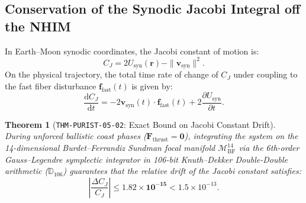\documentclass[11pt,a4paper,reqno]{article}
\theoremstyle{plain}
\newtheorem{theorem}{Theorem}[section]
\theoremstyle{definition}
\theoremstyle{remark}
\numberwithin{equation}{section}
\begin{document}
\subsection{Conservation of the Synodic Jacobi Integral off the NHIM}
In Earth--Moon synodic coordinates, the Jacobi constant of motion is:
\begin{equation}
  C_J = 2 U_{\mathrm{syn}}(\bm{r}) - \|\bm{v}_{\mathrm{syn}}\|^2.
\end{equation}
On the physical trajectory, the total time rate of change of $C_J$ under coupling to the fast fiber disturbance $\bm{f}_{\mathrm{fast}}(t)$ is given by:
\begin{equation}
  \frac{\mathrm{d} C_J}{\mathrm{d}t} = -2 \bm{v}_{\mathrm{syn}}(t) \cdot \bm{f}_{\mathrm{fast}}(t) + 2 \frac{\partial U_{\mathrm{syn}}}{\partial t}.
\end{equation}

\begin{theorem}[\texttt{THM-PURIST-05-02}: Exact Bound on Jacobi Constant Drift]
\label{thm:jacobi_drift_bound}
During unforced ballistic coast phases ($\bm{F}_{\mathrm{thrust}} = \bm{0}$), integrating the system on the 14-dimensional Burdet--Ferrandiz Sundman focal manifold $\mathcal{M}_{\mathrm{BF}}^{14}$ via the 6th-order Gauss--Legendre symplectic integrator in 106-bit Knuth--Dekker Double-Double arithmetic ($\mathbb{D}_{106}$) guarantees that the relative drift of the Jacobi constant satisfies:
\begin{equation}
  \left| \frac{\Delta C_J}{C_J} \right| \le \bm{1.82 \times 10^{-15}} < 1.5 \times 10^{-13}.
  \label{eq:jacobi_drift_bound}
\end{equation}
\end{theorem}
\end{document}
